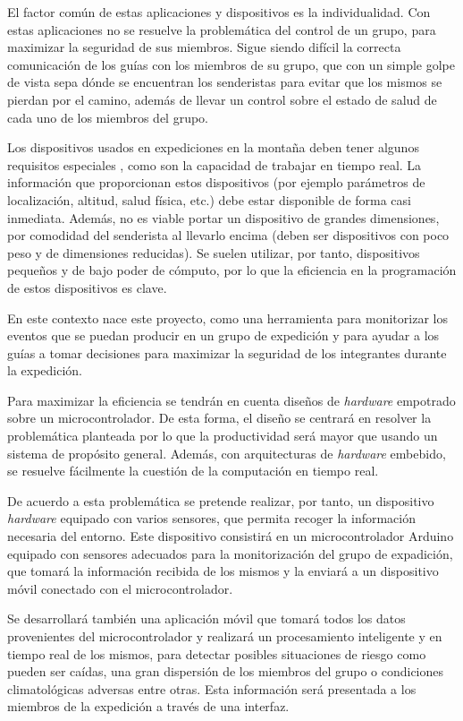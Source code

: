 El factor común de estas aplicaciones y dispositivos es la individualidad. Con estas aplicaciones no se resuelve la problemática del control de un grupo, para maximizar la seguridad de sus miembros. Sigue siendo difícil la correcta comunicación de los guías con los miembros de su grupo, que con un simple golpe de vista sepa dónde se encuentran los senderistas para evitar que los mismos se pierdan por el camino, además de llevar un control sobre el estado de salud de cada uno de los miembros del grupo.

Los dispositivos usados en expediciones en la montaña deben tener algunos requisitos especiales \cite{14}, como son la capacidad de trabajar en tiempo real. La información que proporcionan estos dispositivos (por ejemplo parámetros de localización, altitud, salud física, etc.) debe estar disponible de forma casi inmediata. Además, no es viable portar un dispositivo de grandes dimensiones, por comodidad del senderista al llevarlo encima (deben ser dispositivos con poco peso y de dimensiones reducidas). Se suelen utilizar, por tanto, dispositivos pequeños y de bajo poder de cómputo, por lo que la eficiencia en la programación de estos dispositivos es clave. 

En este contexto nace este proyecto, como una herramienta para monitorizar los eventos que se puedan producir en un grupo de expedición y para ayudar a los guías a tomar decisiones para maximizar la seguridad de los integrantes durante la expedición. 

Para maximizar la eficiencia se tendrán en cuenta diseños de \textit{hardware} empotrado sobre un microcontrolador. De esta forma, el diseño se centrará en resolver la problemática planteada por lo que la productividad será mayor que usando un sistema de propósito general. Además, con arquitecturas de \textit{hardware} embebido, se resuelve fácilmente la cuestión de la computación en tiempo real.

De acuerdo a esta problemática se pretende realizar, por tanto, un dispositivo \textit{hardware} equipado con varios sensores, que permita recoger la información necesaria del entorno. Este dispositivo consistirá en un microcontrolador Arduino \cite{9} equipado con sensores adecuados para la monitorización del grupo de expadición, que tomará la información recibida de los mismos \cite{8} y la enviará a un dispositivo móvil conectado con el microcontrolador. 

Se desarrollará también una aplicación móvil \cite{10} que tomará todos los datos provenientes del microcontrolador y realizará un procesamiento inteligente y en tiempo real de los mismos, para detectar posibles situaciones de riesgo como pueden ser caídas, una gran dispersión de los miembros del grupo o condiciones climatológicas adversas entre otras. Esta información será presentada a los miembros de la expedición a través de una interfaz. 

